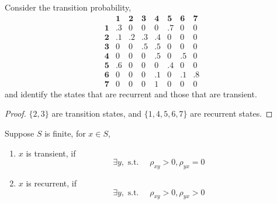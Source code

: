 \begin{example}
    Consider the transition probability,
    \begin{equation*}
        \begin{array}{cccccccc}
                       & \mathbf{1} & \mathbf{2} & \mathbf{3} & \mathbf{4} & \mathbf{5} & \mathbf{6} & \mathbf{7} \\
            \mathbf{1} & .3         & 0          & 0          & 0          & .7         & 0          & 0          \\
            \mathbf{2} & .1         & .2         & .3         & .4         & 0          & 0          & 0          \\
            \mathbf{3} & 0          & 0          & .5         & .5         & 0          & 0          & 0          \\
            \mathbf{4} & 0          & 0          & 0          & .5         & 0          & .5         & 0          \\
            \mathbf{5} & .6         & 0          & 0          & 0          & .4         & 0          & 0          \\
            \mathbf{6} & 0          & 0          & 0          & .1         & 0          & .1         & .8         \\
            \mathbf{7} & 0          & 0          & 0          & 1          & 0          & 0          & 0
        \end{array}
    \end{equation*}
    and identify the states that are recurrent and those that are transient.
\end{example}

\begin{proof}
    $\{2,3\}$ are transition states, and $\{1,4,5,6,7\}$ are recurrent states.
\end{proof}

\begin{remark}
    Suppose $S$ is finite, for $x\in S$,
    \begin{enumerate}
        \item $x$ is transient, if
              \begin{equation*}
                  \exists y,\text{ s.t. }\quad\rho_{xy}>0,\rho_{yx}=0
              \end{equation*}
        \item $x$ is recurrent, if
              \begin{equation*}
                  \exists y,\text{ s.t. }\quad\rho_{xy}>0,\rho_{yx}>0
              \end{equation*}
    \end{enumerate}
\end{remark}

